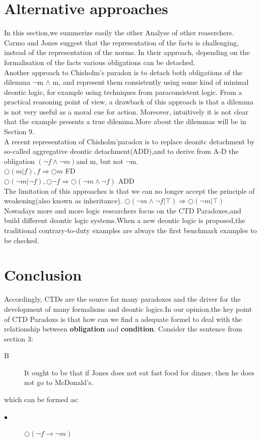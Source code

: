 \documentclass{article}
\begin{document}
\section{Alternative approaches}
In this section,we summerize easily the other Analyse of other reaserchers.\\

  Carmo and Jones \cite{7} suggest that the representation of the facts is challenging,
instead of the representation of the norms. In their approach, depending on the
formalisation of the facts various obligations can be detached.\\
Another approach to Chisholm’s paradox is to detach both obligations of the
dilemma  $\neg$m $\wedge$ m, and represent them consistently using some kind of minimal deontic logic, for example using techniques from paraconsistent logic. From a practical reasoning point of view, a drawback of this approach is that a dilemma is not very useful as a moral cue for action. Moreover, intuitively it is not clear that the example presents a true dilemma.More about the dilemmas will be in Section 9.\\

A recent representation of Chisholm'paradox is to replace deonitc detachment by so-called aggregative deontic detachment(ADD),and to derive from A-D the obligation  $(\neg f \wedge \neg m)$and m, but not $\neg $m.\\
$\bigcirc (m|f),f \Rightarrow \bigcirc m $ FD\\
$\bigcirc(\neg m |\neg f),\bigcirc\neg f \Rightarrow \bigcirc(\neg m \wedge \neg f)$ ADD\\
The limitation of this approaches is that we can no longer accept the principle of weakening(also known as inheritance). 
$\bigcirc(\neg m \wedge\neg f|\top) \Rightarrow \bigcirc(\neg m |\top)$\\

Nowadays more and more logic researchers focus on the CTD Paradoxes,and build different deontic logic systems.When a new deontic logic is proposed,the traditional contrary-to-duty examples are always the first benchmark examples to be checked.

\section{Conclusion}
Accordingly, CTDs are the source for many paradoxes and the driver for the
development of many formalisms and deontic logics.In our opinion,the key point of CTD Paradoxs  is that how can we find a adequate formel to deal with the relationship between \textbf{obligation} and \textbf{condition}.
Consider the sentence from section 3:
\begin{description}
\item[B] It ought to be that if Jones does not eat fast food for dinner, then he does not go to McDonald’s.
\end{description}
which can be formed as:
\begin{description}
\item[$\bullet $]$\bigcirc (\neg f \rightarrow\neg m)$
\end{description}
\end{document}
